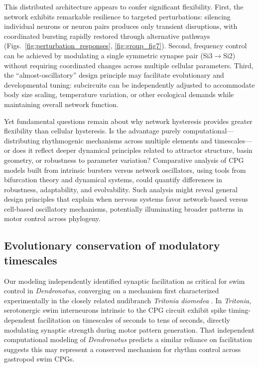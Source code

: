 \documentclass[nofootinbib,aip,amsmath,amssymb,preprint,twocolumn,floatfix,10pt]{revtex4-2}
\begin{document}
This distributed architecture appears to confer significant flexibility. First, the network exhibits remarkable resilience to targeted perturbations: silencing individual neurons or neuron pairs produces only transient disruptions, with coordinated bursting rapidly restored through alternative pathways (Figs.~\ref{fig:perturbation_responses}, \ref{fig:group_fig7}). Second, frequency control can be achieved by modulating a single symmetric synapse pair (Si3$\to$Si2) without requiring coordinated changes across multiple cellular parameters. Third, the ``almost-oscillatory'' design principle may facilitate evolutionary and developmental tuning: subcircuits can be independently adjusted to accommodate body size scaling, temperature variation, or other ecological demands while maintaining overall network function.

Yet fundamental questions remain about why network hysteresis provides greater flexibility than cellular hysteresis. Is the advantage purely computational---distributing rhythmogenic mechanisms across multiple elements and timescales---or does it reflect deeper dynamical principles related to attractor structure, basin geometry, or robustness to parameter variation? Comparative analysis of CPG models built from intrinsic bursters versus network oscillators, using tools from bifurcation theory and dynamical systems, could quantify differences in robustness, adaptability, and evolvability. Such analysis might reveal general design principles that explain when nervous systems favor network-based versus cell-based oscillatory mechanisms, potentially illuminating broader patterns in motor control across phylogeny.

\subsection{Evolutionary conservation of modulatory timescales}

Our modeling independently identified synaptic facilitation as critical for swim control in \textit{Dendronotus}, converging on a mechanism first characterized experimentally in the closely related nudibranch \textit{Tritonia diomedea} \cite{katz1994dynamic, sakurai2003spike}. In \textit{Tritonia}, serotonergic swim interneurons intrinsic to the CPG circuit exhibit spike timing-dependent facilitation on timescales of seconds to tens of seconds, directly modulating synaptic strength during motor pattern generation. That independent computational modeling of \textit{Dendronotus} predicts a similar reliance on facilitation suggests this may represent a conserved mechanism for rhythm control across gastropod swim CPGs.
\end{document}
